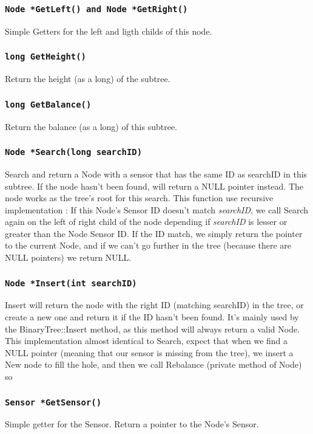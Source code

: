 \documentclass[10pt]{article}
\begin{document}
\subsubsection*{\tt Node *GetLeft()  and Node *GetRight() }
Simple Getters for the left and ligth childs of this node.

\subsubsection*{\tt long GetHeight()}
Return the height (as a long) of the subtree.

\subsubsection*{\tt long GetBalance()}
Return the balance (as a long) of this subtree.

\subsubsection*{\tt Node *Search(long searchID)}
Search and return a Node with a sensor that has the same ID as searchID in this subtree. If the node hasn't been found, will return a NULL pointer instead.
The node works as the tree's root for this search. This function use recursive implementation : If this Node's Sensor ID doesn't match \emph{searchID}, we call Search again on the left of right child of the node depending if \emph{searchID} is lesser or greater than the Node Sensor ID. If the ID match, we simply return the pointer to the current Node, and if we can't go further in the tree (because there are NULL pointers) we return NULL. 

\subsubsection*{\tt Node *Insert(int searchID)}
Insert will return the node with the right ID (matching searchID) in the tree, or create a new one and return it if the ID hasn't been found. It's mainly used by the BinaryTree::Insert method, as this method will always return a valid Node.
This implementation almost identical to Search, expect that when we find a NULL pointer (meaning that our sensor is missing from the tree), we insert a New node to fill the hole, and then we call Rebalance (private method of Node) so

\subsubsection*{\tt Sensor *GetSensor()}
Simple getter for the Sensor. Return a pointer to the Node's Sensor.
\end{document}
